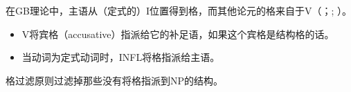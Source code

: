 在GB理论中，主语从（定式的）I位置得到格，而其他论元的格来自于V（\citealp[]{Chomsky81a}；\citealp[]{Haider84b}; \citealp[--73]{FF87}）。
\begin{principle-break}[格指派原则]\label{Kasusprinzip-GB}
\begin{itemize}
\item V将宾格（accusative）指派给它的补足语，如果这个宾格是结构格的话。 
\item 当动词为定式动词时，INFL将格指派给主语。 
\end{itemize}
\end{principle-break}

格过滤原则过滤掉那些没有将格指派到NP的结构。

